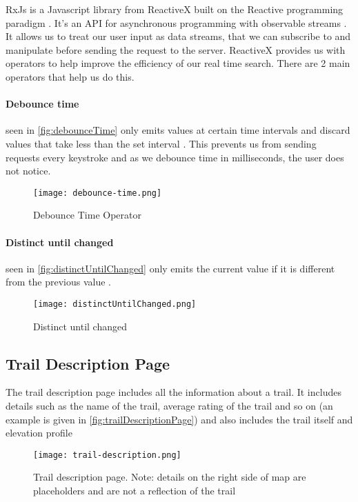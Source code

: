 RxJs is a Javascript library from ReactiveX built on the Reactive programming paradigm \cite{wan2000functional}. It's an API for asynchronous programming with observable streams \cite{reactivex2018main}. It allows us to treat our user input as data streams, that we can subscribe to and manipulate before sending the request to the server. ReactiveX provides us with operators to help improve the efficiency of our real time search. There are 2 main operators that help us do this.

\paragraph{Debounce time} seen in \autoref{fig:debounceTime} only emits values at certain time intervals and discard values that take less than the set interval \cite{leanrrxjs2019debounce}. This prevents us from sending requests every keystroke and as we debounce time in milliseconds, the user does not notice.

\begin{figure}[htb!]
    \centering
    \texttt{[image: debounce-time.png]}
    \caption{Debounce Time Operator}
    \label{fig:debounceTime}
\end{figure}

\paragraph{Distinct until changed} seen in \autoref{fig:distinctUntilChanged} only emits the current value if it is different from the previous value \cite{leanrrxjs2019distinct}.
\begin{figure}[htb!]
    \centering
    \texttt{[image: distinctUntilChanged.png]}
    \caption{Distinct until changed}
    \label{fig:distinctUntilChanged}
\end{figure}

\subsection{Trail Description Page}
The trail description page includes all the information about a trail. It includes details such as the name of the trail, average rating of the trail and so on (an example is given in \autoref{fig:trailDescriptionPage}) and also includes the trail itself and elevation profile

\begin{figure}[htb!]
    \centering
    \texttt{[image: trail-description.png]}
    \caption{Trail description page. Note: details on the right side of map are placeholders and are not a reflection of the trail}
    \label{fig:trailDescriptionPage}
\end{figure}

